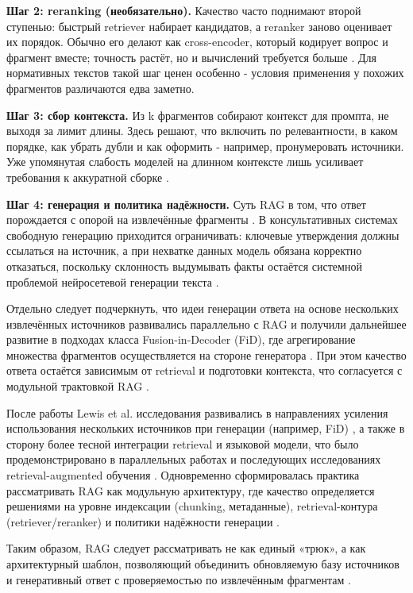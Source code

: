 \documentclass[a4paper,12pt]{article}
\begin{document}
\textbf{Шаг 2: reranking (необязательно).} Качество часто поднимают второй ступенью: быстрый retriever набирает кандидатов, а reranker заново оценивает их порядок. Обычно его делают как cross-encoder, который кодирует вопрос и фрагмент вместе; точность растёт, но и вычислений требуется больше \cite{nogueira2019passage}. Для нормативных текстов такой шаг ценен особенно - условия применения у похожих фрагментов различаются едва заметно.

\textbf{Шаг 3: сбор контекста.} Из k фрагментов собирают контекст для промпта, не выходя за лимит длины. Здесь решают, что включить по релевантности, в каком порядке, как убрать дубли и как оформить - например, пронумеровать источники. Уже упомянутая слабость моделей на длинном контексте лишь усиливает требования к аккуратной сборке \cite{liu2023lost}.

\textbf{Шаг 4: генерация и политика надёжности.} Суть RAG в том, что ответ порождается с опорой на извлечённые фрагменты \cite{lewis2020rag}. В консультативных системах свободную генерацию приходится ограничивать: ключевые утверждения должны ссылаться на источник, а при нехватке данных модель обязана корректно отказаться, поскольку склонность выдумывать факты остаётся системной проблемой нейросетевой генерации текста \cite{ji2023hallucination}.

Отдельно следует подчеркнуть, что идеи генерации ответа на основе нескольких извлечённых источников развивались параллельно с RAG и получили дальнейшее развитие в подходах класса Fusion-in-Decoder (FiD), где агрегирование множества фрагментов осуществляется на стороне генератора \cite{izacard2021fid}. При этом качество ответа остаётся зависимым от retrieval и подготовки контекста, что согласуется с модульной трактовкой RAG \cite{lewis2020rag,gao2023rag_survey}.

После работы Lewis et al. исследования развивались в направлениях усиления использования нескольких источников при генерации (например, FiD) \cite{izacard2021fid}, а также в сторону более тесной интеграции retrieval и языковой модели, что было продемонстрировано в параллельных работах и последующих исследованиях retrieval-augmented обучения \cite{guu2020realm}. Одновременно сформировалась практика рассматривать RAG как модульную архитектуру, где качество определяется решениями на уровне индексации (chunking, метаданные), retrieval-контура (retriever/reranker) и политики надёжности генерации \cite{gao2023rag_survey,lewis2020rag}.

Таким образом, RAG следует рассматривать не как единый «трюк», а как архитектурный шаблон, позволяющий объединить обновляемую базу источников и генеративный ответ с проверяемостью по извлечённым фрагментам \cite{lewis2020rag}.
\end{document}
